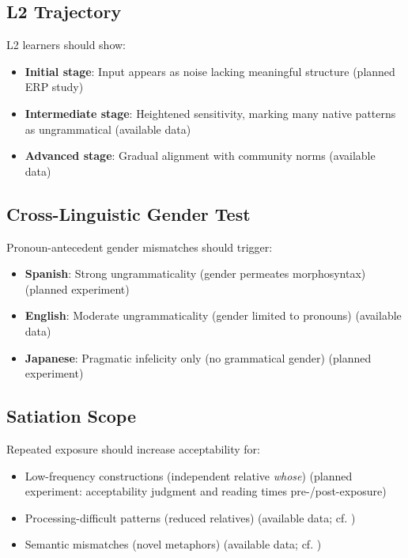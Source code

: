 \documentclass[12pt]{article}
\begin{document}
\subsection{L2 Trajectory}

L2 learners should show:
\begin{itemize}
\item \textbf{Initial stage}: Input appears as noise lacking meaningful structure (planned ERP study)
\item \textbf{Intermediate stage}: Heightened sensitivity, marking many native patterns as ungrammatical (available data)
\item \textbf{Advanced stage}: Gradual alignment with community norms (available data)
\end{itemize}

\subsection{Cross-Linguistic Gender Test}

Pronoun-antecedent gender mismatches should trigger:
\begin{itemize}
\item \textbf{Spanish}: Strong ungrammaticality (gender permeates morphosyntax) (planned experiment)
\item \textbf{English}: Moderate ungrammaticality (gender limited to pronouns) (available data)
\item \textbf{Japanese}: Pragmatic infelicity only (no grammatical gender) (planned experiment)
\end{itemize}

\subsection{Satiation Scope}

Repeated exposure should increase acceptability for:
\begin{itemize}
\item Low-frequency constructions (independent relative \textit{whose}) (planned experiment: acceptability judgment and reading times pre-/post-exposure)
\item Processing-difficult patterns (reduced relatives) (available data; cf. \parencite{snyder2000grammaticality,hofmeister2013processing})
\item Semantic mismatches (novel metaphors) (available data; cf. \parencite{giora1997understanding})
\end{itemize}
\end{document}
